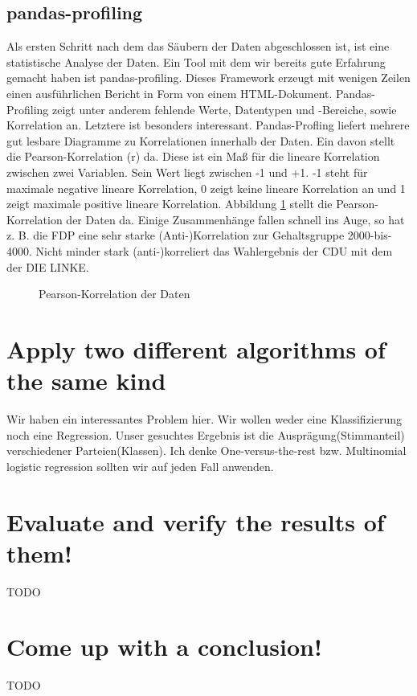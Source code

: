\documentclass[a4paper,10pt]{scrartcl}
\begin{document}
\subsection{pandas-profiling}
Als ersten Schritt nach dem das Säubern der Daten abgeschlossen ist, ist eine statistische Analyse der Daten. Ein Tool mit dem wir bereits gute Erfahrung gemacht haben ist pandas-profiling. Dieses Framework erzeugt mit wenigen Zeilen einen ausführlichen Bericht in Form von einem HTML-Dokument. Pandas-Profiling zeigt unter anderem fehlende Werte, Datentypen und -Bereiche, sowie Korrelation an. Letztere ist besonders interessant. Pandas-Profling liefert mehrere gut lesbare Diagramme zu Korrelationen innerhalb der Daten. Ein davon stellt die Pearson-Korrelation (r) da. Diese ist ein Maß für die lineare Korrelation zwischen zwei Variablen. Sein Wert liegt zwischen -1 und +1. -1 steht für maximale negative lineare Korrelation, 0 zeigt keine lineare Korrelation an und 1 zeigt maximale positive lineare Korrelation. Abbildung \ref{fig:correlation} stellt die Pearson-Korrelation der Daten da. Einige Zusammenhänge fallen schnell ins Auge, so hat z. B. die FDP eine sehr starke (Anti-)Korrelation zur Gehaltsgruppe 2000-bis-4000. Nicht minder stark (anti-)korreliert das Wahlergebnis der CDU mit dem der DIE LINKE.
\begin{figure}
	\centering
	\caption{Pearson-Korrelation der Daten}
	\label{fig:correlation}
\end{figure}


\section{Apply two different algorithms of the same kind}
Wir haben ein interessantes Problem hier. Wir wollen weder eine Klassifizierung noch eine Regression. Unser gesuchtes Ergebnis ist die Ausprägung(Stimmanteil) verschiedener Parteien(Klassen). Ich denke One-versus-the-rest bzw. Multinomial logistic regression sollten wir auf jeden Fall anwenden.

\section{Evaluate and verify the results of them!}
TODO
\section{Come up with a conclusion!}
TODO
\end{document}

